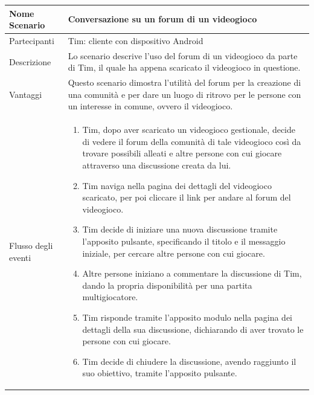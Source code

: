 	\small\begin{tabular}{|| l | p{30em} ||} 
	\hline
	Nome Scenario & Conversazione su un forum di un videogioco\\
	\hline
	Partecipanti & Tim: cliente con dispositivo Android\\
	\hline
	Descrizione & Lo scenario descrive l’uso del forum di un videogioco da parte di Tim, il quale ha appena scaricato il videogioco in questione.\\
	\hline
	Vantaggi & Questo scenario dimostra l’utilità del forum per la creazione di una comunità e per dare un luogo di ritrovo per le persone con un interesse in comune, ovvero il videogioco.\\
	\hline
	Flusso degli eventi &
	\begin{enumerate}
		\item Tim, dopo aver scaricato un videogioco gestionale, decide di vedere il forum della comunità di tale videogioco così da trovare possibili alleati e altre persone con cui giocare attraverso una discussione creata da lui.
		\item Tim naviga nella pagina dei dettagli del videogioco scaricato, per poi cliccare il link per andare al forum del videogioco.
		\item Tim decide di iniziare una nuova discussione tramite l’apposito pulsante, specificando il titolo e il messaggio iniziale, per cercare altre persone con cui giocare.
		\item Altre persone iniziano a commentare la discussione di Tim, dando la propria disponibilità per una partita multigiocatore.
		\item Tim risponde tramite l’apposito modulo nella pagina dei dettagli della sua discussione, dichiarando di aver trovato le persone con cui giocare.
		\item Tim decide di chiudere la discussione, avendo raggiunto il suo obiettivo, tramite l’apposito pulsante.
	\end{enumerate} \\
	\hline
	\end{tabular}

